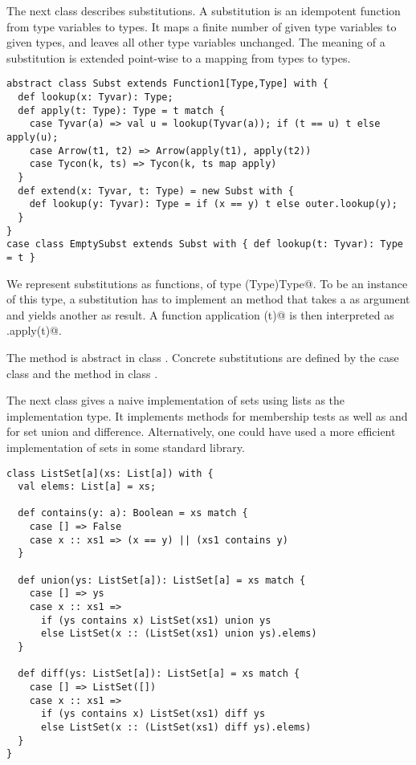 \documentclass[11pt]{report}
\begin{document}
The next class describes substitutions. A substitution is an
idempotent function from type variables to types. It maps a finite
number of given type variables to given types, and leaves all other
type variables unchanged. The meaning of a substitution is extended
point-wise to a mapping from types to types.

\begin{verbatim}
abstract class Subst extends Function1[Type,Type] with {
  def lookup(x: Tyvar): Type;
  def apply(t: Type): Type = t match {
    case Tyvar(a) => val u = lookup(Tyvar(a)); if (t == u) t else apply(u);
    case Arrow(t1, t2) => Arrow(apply(t1), apply(t2))
    case Tycon(k, ts) => Tycon(k, ts map apply)
  }
  def extend(x: Tyvar, t: Type) = new Subst with {
    def lookup(y: Tyvar): Type = if (x == y) t else outer.lookup(y);
  }
}
case class EmptySubst extends Subst with { def lookup(t: Tyvar): Type = t }
\end{verbatim}
We represent substitutions as functions, of type
\verb@(Type)Type@. To be an instance of this type, a
substitution \verb@s@ has to implement an \verb@apply@ method that takes a
\verb@Type@ as argument and yields another \verb@Type@ as result. A function
application \verb@s(t)@ is then interpreted as \verb@s.apply(t)@.

The \verb@lookup@ method is abstract in class \verb@Subst@.  Concrete
substitutions are defined by the case class \verb@EmptySubst@ and the
method \verb@extend@ in class \verb@Subst@.

The next class gives a naive implementation of sets using lists as the
implementation type. It implements methods \verb@contains@ for
membership tests as well as \verb@union@ and \verb@diff@ for set union
and difference. Alternatively, one could have used a more efficient
implementation of sets in some standard library.
\begin{verbatim}
class ListSet[a](xs: List[a]) with {
  val elems: List[a] = xs;

  def contains(y: a): Boolean = xs match {
    case [] => False
    case x :: xs1 => (x == y) || (xs1 contains y)
  }

  def union(ys: ListSet[a]): ListSet[a] = xs match {
    case [] => ys
    case x :: xs1 =>
      if (ys contains x) ListSet(xs1) union ys
      else ListSet(x :: (ListSet(xs1) union ys).elems)
  }

  def diff(ys: ListSet[a]): ListSet[a] = xs match {
    case [] => ListSet([])
    case x :: xs1 =>
      if (ys contains x) ListSet(xs1) diff ys
      else ListSet(x :: (ListSet(xs1) diff ys).elems)
  }
}
\end{verbatim}
\end{document}
